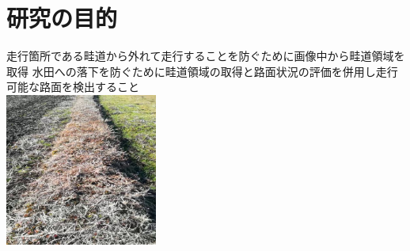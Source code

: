 \chapter{研究の目的}\label{chap:purpose}

走行箇所である畦道から外れて走行することを防ぐために画像中から畦道領域を取得
水田への落下を防ぐために畦道領域の取得と路面状況の評価を併用し走行可能な路面を検出すること
\\
\includegraphics[width=5cm]{figs/fig1.jpg}

